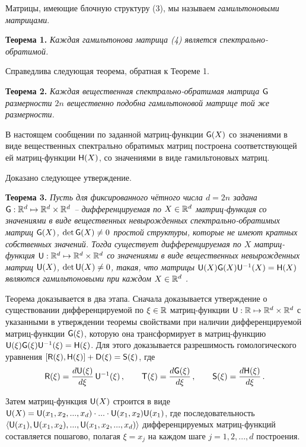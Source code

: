 Матрицы, имеющие блочную структуру (3), мы называем {\it гамильтоновыми матрицами}.

\textbf{Теорема 1.} {\it Каждая гамильтонова матрица (4) является спектрально-обратимой.}
\smallskip

Справедлива следующая теорема, обратная к Теореме 1.
\smallskip

\textbf{Теорема 2.} {\it Каждая вещественная спектрально-обратимая матрица ${\sf G}$ размерности $2n$ вещественно подобна гамильтоновой матрице той же размерности.}
\smallskip

В настоящем сообщении  по заданной матриц-функ\-ции ${\sf G}(X)$ со значениями в виде вещественных спектрально обратимых матриц построена соответствующей ей  матриц-функции ${\sf H}(X)$, со значениями в виде  гамильтоновых матриц.

Доказано следующее утверждение.
\smallskip

\textbf{Теорема 3.} {\it Пусть для фиксированного чётного числа $d  = 2n$ задана ${\sf G}: {\Bbb R}^d \mapsto {\Bbb R}^d\times {\Bbb R}^d$ -- дифференцируемая по $X \in {\Bbb R}^d$ матриц-фун\-к\-ция со значениями в виде вещественных  невырожденных спектрально-обратимых матриц  ${\sf G}(X)$, $\det {\sf G}(X) \ne 0$ простой структуры, которые не имеют кратных собственных значений. Тогда существует дифференцируемая по $X$ матриц-фун\-к\-ция ${\sf U}: {\Bbb R}^{d} \mapsto {\Bbb R}^d \times {\Bbb R}^d$ со значениями в виде вещественных невырожденных матриц ${\sf U}(X)$,  $\det {\sf U}(X) \ne 0$, такая, что матрицы ${\sf U}(X){\sf  G}(X){\sf U}^{-1}(X) =  {\sf H} (X)$ являются гамильтоновыми при каждом $X \in {\Bbb R}^d$ .}
\smallskip

Теорема доказывается в два этапа. Сначала  доказывается утверждение о существовании дифференцируемой  по $\xi \in {\Bbb R}$ матриц-функции ${\sf U}: {\Bbb R} \mapsto {\Bbb R}^d \times {\Bbb R}^d$ с указанными в утверждении теоремы свойствами при наличии дифференцируемой матриц-функции ${\sf G}(\xi)$, которую она трансформирует в матриц-функцию  ${\sf U}(\xi){\sf  G}(\xi){\sf U}^{-1}(\xi) =  {\sf H} (\xi)$. Для этого доказывается разрешимость гомологического уравнения $[{\sf R}(\xi), {\sf H}(\xi)] + {\sf D}(\xi) = {\sf S}(\xi)$, где
$${\sf R}(\xi) = \frac {d {\sf U}(\xi)}{d \xi}\,{\sf U}^{-1}(\xi) \,, \qquad {\sf T}(\xi) = \frac {d {\sf G}(\xi)}{d \xi}\,, \qquad {\sf S}(\xi) = \frac {d {\sf H}(\xi)}{d \xi}\,. $$

Затем матриц-функция ${\sf U}(X)$ строится в виде ${\sf U}(X) = {\sf U}(x_1, x_2, ..., x_d) \cdot ... \cdot {\sf U}(x_1, x_2) {\sf U}(x_1)$, где последовательность $\langle {\sf U}(x_1), {\sf U}(x_1, x_2), ..., {\sf U}(x_1, x_2, ..., x_d)\rangle$  дифференцируемых  мат\-риц-функций  составляется пошагово, полагая $\xi = x_j$ на каждом шаге $j = 1, 2, ..., d$ построения.
\smallskip

